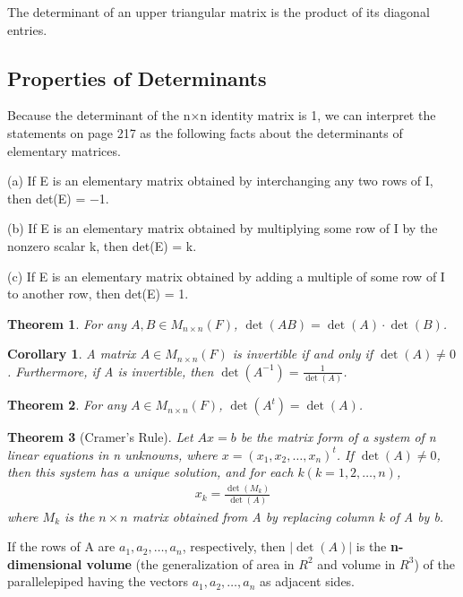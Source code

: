 \documentclass{article}
\newcommand{\bd}[1]{\textbf{#1}}
\theoremstyle{plain}
\newtheorem{theorem}{Theorem}[section]
\newtheorem*{corollary}{Corollary}
\theoremstyle{plain} %
\begin{document}
The determinant of an upper triangular matrix is the product of its diagonal entries.

\subsection{Properties of Determinants}

Because the determinant of the n×n identity matrix is 1, we can interpret the statements on page 217 as the following facts about the determinants of elementary matrices.

(a) If E is an elementary matrix obtained by interchanging any two rows of I, then det(E) = −1.

(b) If E is an elementary matrix obtained by multiplying some row of I by the nonzero scalar k, then det(E) = k.

(c) If E is an elementary matrix obtained by adding a multiple of some row of I to another row, then det(E) = 1.

\begin{theorem}
  For any $A, B \in M_{n\times n}(F)$, $\det(AB) = \det(A)\cdot \det(B)$.
\end{theorem}

\begin{corollary}
  A matrix $A \in M_{n\times n}(F)$ is invertible if and only if $\det(A) \neq  0$. Furthermore, if A is invertible, then $\det(A^{-1}) = \frac{1}{\det(A)}$.
\end{corollary}

\begin{theorem}
  For any $A \in M_{n\times n}(F)$, $\det(A^t) = \det(A)$.
\end{theorem}

\begin{theorem}[Cramer's Rule]
  Let $Ax = b$ be the matrix form of a system of n linear equations in n unknowns, where $x = (x_1, x_2,\ldots,x_n)^t$. If $\det(A) \neq 0$, then this system has a unique solution, and for each $k (k =1, 2,\ldots,n)$,
  \begin{align*}
    x_k=\frac{\det(M_k)}{\det (A)}
  \end{align*}
  where $M_k$ is the $n \times n$ matrix obtained from A by replacing column k of A by b.
\end{theorem}

If the rows of A are $a_1, a_2,\ldots,a_n$, respectively, then $\lvert \det(A)\rvert$ is the \bd{n-dimensional volume} (the generalization of area in $R^2$ and volume in $R^3$) of the parallelepiped having the vectors $a_1, a_2,\ldots,a_n$ as adjacent sides.
\end{document}
